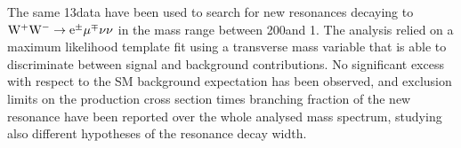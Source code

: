 The same 13\TeV data have been used to search for new resonances decaying to $\rm{W^+W^-}\to e^{\pm} \mu^{\mp}\nu\nu$ in the mass range between 200\GeV and 1\TeV. The analysis relied on a maximum likelihood template fit using a transverse mass variable that is able to discriminate between signal and background contributions. No significant excess with respect to the SM background expectation has been observed, and exclusion limits on the production cross section times branching fraction of the new resonance have been reported over the whole analysed mass spectrum, studying also different hypotheses of the resonance decay width.
